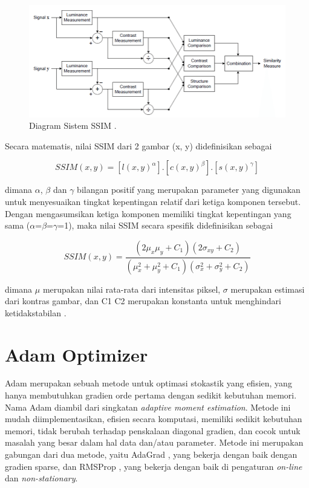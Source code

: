 \begin{figure}[ht]
  \centering
  \includegraphics[scale=0.5]{gambar/SSIM.png}
  \caption{Diagram Sistem SSIM \parencite{SSIM}.}
  \label{fig:SSIM}
\end{figure}

Secara matematis, nilai SSIM dari 2 gambar (x, y) didefinisikan sebagai 

\begin{equation}
  \label{eq:ssim1}
  SSIM(x,y) =  [l(x,y)^{ \alpha } ] . [c(x,y)^{ \beta }].[s(x,y)^{ \gamma }]
\end{equation}

dimana $\alpha$, $\beta$ dan $\gamma$ bilangan positif yang merupakan parameter yang digunakan untuk menyesuaikan tingkat kepentingan relatif dari ketiga komponen tersebut. 
Dengan mengasumsikan ketiga komponen memiliki tingkat kepentingan yang sama ($\alpha$=$\beta$=$\gamma$=1), maka nilai SSIM secara spesifik didefinisikan sebagai 

\begin{equation}
  \label{eq:ssim2}
  SSIM(x,y) =  \frac{(2  \mu_{x} \mu_{y} + C_{1})(2 \sigma_{xy} + C_{2} )}{(\mu_{x}^{2}  + \mu_{y}^{2}+C_{1})(\sigma_{x}^{2}+\sigma_{y}^{2}+C_{2})} 
\end{equation}

dimana $\mu$ merupakan nilai rata-rata dari intensitas piksel, $\sigma$ merupakan estimasi dari kontras gambar, dan C1 C2 merupakan konstanta untuk menghindari ketidakstabilan \parencite{SSIM}.

\section{Adam Optimizer}
\label{adamOptimizer}

Adam merupakan sebuah metode untuk optimasi stokastik yang efisien, yang hanya membutuhkan gradien orde pertama dengan sedikit kebutuhan memori. 
Nama Adam diambil dari singkatan \emph{adaptive moment estimation}. 
Metode ini mudah diimplementasikan, efisien secara komputasi, memiliki sedikit kebutuhan memori, tidak berubah terhadap penskalaan diagonal gradien, dan cocok untuk masalah yang besar dalam hal data dan/atau parameter. 
Metode ini merupakan gabungan dari dua metode, yaitu AdaGrad \parencite{adaGrad}, yang bekerja dengan baik dengan gradien sparse, 
dan RMSProp \parencite{RMSProp}, yang bekerja dengan baik di pengaturan \emph{on-line} dan \emph{non-stationary}\parencite{adam}.